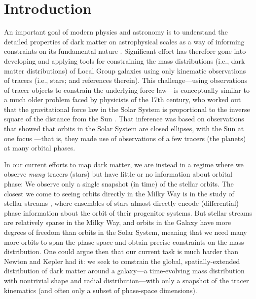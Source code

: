 \documentclass[modern]{aastex63}
\begin{document}

\section{Introduction}
\label{sec:intro}

An important goal of modern physics and astronomy is to understand the detailed
properties of dark matter on astrophysical scales as a way of informing
constraints on its fundamental nature \citep[see, e.g., recent reviews
by][]{Bullock:2017, Buckley:2018}.
Significant effort has therefore gone into developing and applying tools for
constraining the mass distributions (i.e., dark matter distributions) of Local
Group galaxies using only kinematic observations of tracers (i.e., stars;
\citealt{Jeans:1919b, Binney:2008} and references therein).
This challenge---using observations of tracer objects to constrain the
underlying force law---is conceptually similar to a much older problem faced by
physicists of the 17th century, who worked out that the gravitational force law
in the Solar System is proportional to the inverse square of the distance from
the Sun \citep{Newton:1687}.
That inference was based on observations that showed that orbits in the Solar
System are closed ellipses, with the Sun at one focus \citep{Kepler:1609}---that
is, they made use of observations of a few tracers (the planets) at many orbital
phases.

In our current efforts to map dark matter, we are instead in a regime where we
observe \emph{many} tracers (stars) but have little or no information about
orbital phase: We observe only a single snapshot (in time) of the stellar
orbits.
The closest we come to seeing orbits directly in the Milky Way is in the study
of stellar streams \citep[e.g.,][]{Johnston:1999, Helmi:1999, Eyre:2011,
Sanders:2013, Price-Whelan:2014, Bonaca:2018}, where ensembles of stars almost
directly encode (differential) phase information about the orbit of their
progenitor systems.
But stellar streams are relatively sparse in the Milky Way, and orbits in the
Galaxy have more degrees of freedom than orbits in the Solar System, meaning
that we need many more orbits to span the phase-space and obtain precise
constraints on the mass distribution.
One could argue then that our current task is much harder than Newton and Kepler
had it:
we seek to constrain the global, spatially-extended distribution of dark matter
around a galaxy---a time-evolving mass distribution with nontrivial shape and
radial distribution---with only a snapshot of the tracer kinematics (and often
only a subset of phase-space dimensions).
\end{document}
